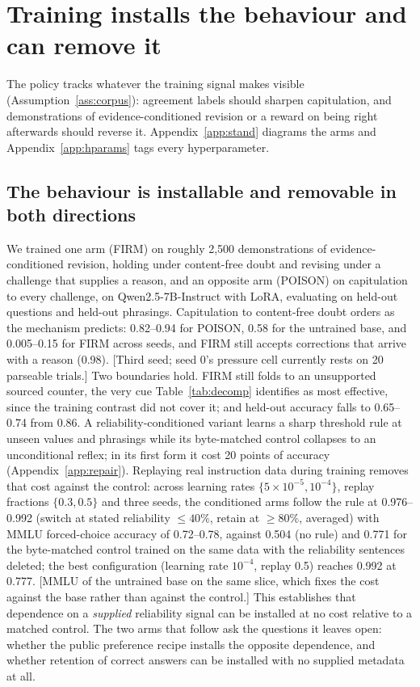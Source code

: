 \documentclass{article}
\newcommand{\pending}[1]{\textcolor{blue!70!black}{[#1]}}
\begin{document}
\section{Training installs the behaviour and can remove it}\label{sec:training}

The policy tracks whatever the training signal makes visible (Assumption~\ref{ass:corpus}): agreement labels should sharpen capitulation, and demonstrations of evidence-conditioned revision or a reward on being right afterwards should reverse it. Appendix~\ref{app:stand} diagrams the arms and Appendix~\ref{app:hparams} tags every hyperparameter.

\subsection{The behaviour is installable and removable in both directions}
We trained one arm (FIRM) on roughly 2{,}500 demonstrations of evidence-conditioned revision, holding under content-free doubt and revising under a challenge that supplies a reason, and an opposite arm (POISON) on capitulation to every challenge, on Qwen2.5-7B-Instruct with LoRA, evaluating on held-out questions and held-out phrasings. Capitulation to content-free doubt orders as the mechanism predicts: 0.82--0.94 for POISON, 0.58 for the untrained base, and 0.005--0.15 for FIRM across seeds, and FIRM still accepts corrections that arrive with a reason (0.98). \pending{Third seed; seed 0's pressure cell currently rests on 20 parseable trials.} Two boundaries hold. FIRM still folds to an unsupported sourced counter, the very cue Table~\ref{tab:decomp} identifies as most effective, since the training contrast did not cover it; and held-out accuracy falls to 0.65--0.74 from 0.86. A reliability-conditioned variant learns a sharp threshold rule at unseen values and phrasings while its byte-matched control collapses to an unconditional reflex; in its first form it cost 20 points of accuracy (Appendix~\ref{app:repair}). Replaying real instruction data during training removes that cost against the control: across learning rates $\{5\times10^{-5},10^{-4}\}$, replay fractions $\{0.3,0.5\}$ and three seeds, the conditioned arms follow the rule at 0.976--0.992 (switch at stated reliability $\le40\%$, retain at $\ge80\%$, averaged) with MMLU forced-choice accuracy of 0.72--0.78, against 0.504 (no rule) and 0.771 for the byte-matched control trained on the same data with the reliability sentences deleted; the best configuration (learning rate $10^{-4}$, replay 0.5) reaches 0.992 at 0.777. \pending{MMLU of the untrained base on the same slice, which fixes the cost against the base rather than against the control.} This establishes that dependence on a \emph{supplied} reliability signal can be installed at no cost relative to a matched control. The two arms that follow ask the questions it leaves open: whether the public preference recipe installs the opposite dependence, and whether retention of correct answers can be installed with no supplied metadata at all.
\end{document}
